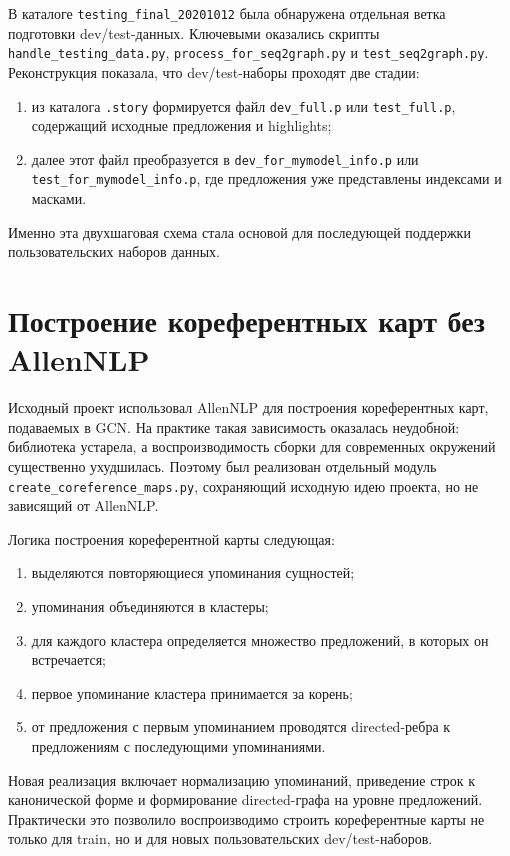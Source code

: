 \documentclass[12pt,a4paper]{article}
\begin{document}
В каталоге \texttt{testing\_final\_20201012} была обнаружена отдельная ветка подготовки dev/test-данных. Ключевыми оказались скрипты \texttt{handle\_testing\_data.py}, \texttt{process\_for\_seq2graph.py} и \texttt{test\_seq2graph.py}. Реконструкция показала, что dev/test-наборы проходят две стадии:

\begin{enumerate}
    \item из каталога \texttt{.story} формируется файл \texttt{dev\_full.p} или \texttt{test\_full.p}, содержащий исходные предложения и highlights;
    \item далее этот файл преобразуется в \texttt{dev\_for\_mymodel\_info.p} или \texttt{test\_for\_mymodel\_info.p}, где предложения уже представлены индексами и масками.
\end{enumerate}

Именно эта двухшаговая схема стала основой для последующей поддержки пользовательских наборов данных.

\section{Построение кореферентных карт без AllenNLP}

Исходный проект использовал AllenNLP для построения кореферентных карт, подаваемых в GCN. На практике такая зависимость оказалась неудобной: библиотека устарела, а воспроизводимость сборки для современных окружений существенно ухудшилась. Поэтому был реализован отдельный модуль \texttt{create\_coreference\_maps.py}, сохраняющий исходную идею проекта, но не зависящий от AllenNLP.

Логика построения кореферентной карты следующая:

\begin{enumerate}
    \item выделяются повторяющиеся упоминания сущностей;
    \item упоминания объединяются в кластеры;
    \item для каждого кластера определяется множество предложений, в которых он встречается;
    \item первое упоминание кластера принимается за корень;
    \item от предложения с первым упоминанием проводятся directed-ребра к предложениям с последующими упоминаниями.
\end{enumerate}

Новая реализация включает нормализацию упоминаний, приведение строк к канонической форме и формирование directed-графа на уровне предложений. Практически это позволило воспроизводимо строить кореферентные карты не только для train, но и для новых пользовательских dev/test-наборов.
\end{document}
